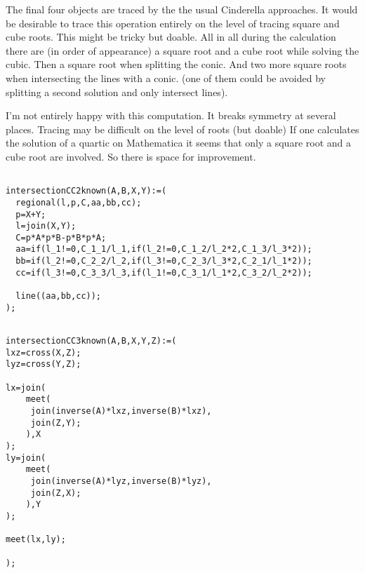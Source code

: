 \documentclass[11pt]{article}
\newcounter{subsubsubsection}[subsubsection]
\begin{document}
\medskip
{}
The final four objects are traced by the the usual Cinderella approaches.
It would be desirable to trace this operation entirely on the level of tracing square and cube roots.
This might be tricky but doable. All in all during the calculation
there are (in order of appearance) a square root and a cube root while solving the cubic. Then a square root when splitting the conic.
And two more square roots when intersecting the lines with a conic. (one of them could be avoided by splitting a second solution and only intersect lines).

\medskip
{}
I'm not entirely happy with this computation. It breaks symmetry at several places. Tracing may be difficult on the level of roots (but doable)
If one calculates the solution of a quartic on Mathematica it seems that only a square root and a cube root are involved. So there is space for improvement.


\begin{verbatim}

intersectionCC2known(A,B,X,Y):=(
  regional(l,p,C,aa,bb,cc);
  p=X+Y;
  l=join(X,Y);
  C=p*A*p*B-p*B*p*A;
  aa=if(l_1!=0,C_1_1/l_1,if(l_2!=0,C_1_2/l_2*2,C_1_3/l_3*2));
  bb=if(l_2!=0,C_2_2/l_2,if(l_3!=0,C_2_3/l_3*2,C_2_1/l_1*2));
  cc=if(l_3!=0,C_3_3/l_3,if(l_1!=0,C_3_1/l_1*2,C_3_2/l_2*2));

  line((aa,bb,cc));
);
\end{verbatim}


\begin{verbatim}

intersectionCC3known(A,B,X,Y,Z):=(
lxz=cross(X,Z);
lyz=cross(Y,Z);

lx=join(
    meet(
     join(inverse(A)*lxz,inverse(B)*lxz),
     join(Z,Y);
    ),X
);
ly=join(
    meet(
     join(inverse(A)*lyz,inverse(B)*lyz),
     join(Z,X);
    ),Y
);   
 
meet(lx,ly);

);
\end{verbatim}

\end{document}
